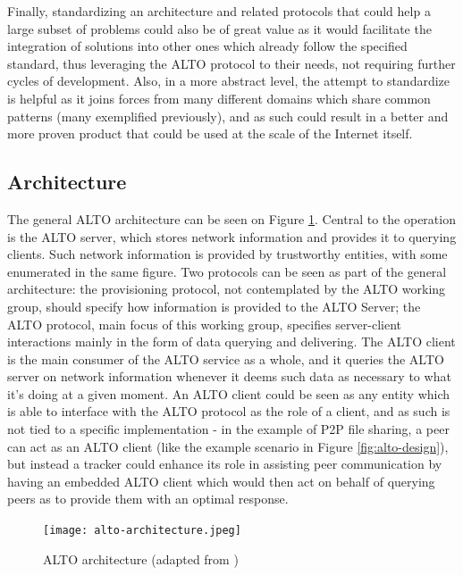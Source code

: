     Finally, standardizing an architecture and related protocols that could help a large subset of problems could also be of great value as it would facilitate the integration of solutions into other ones which already follow the specified standard, thus leveraging the ALTO protocol to their needs, not requiring further cycles of development.
    Also, in a more abstract level, the attempt to standardize is helpful as it joins forces from many different domains which share common patterns (many exemplified previously), and as such could result in a better and more proven product that could be used at the scale of the Internet itself.

\subsection{Architecture}


    The general ALTO architecture can be seen on Figure \ref{fig:alto-architecture}.
    Central to the operation is the ALTO server, which stores network information and provides it to querying clients.
    Such network information is provided by trustworthy entities, with some enumerated in the same figure.
    Two protocols can be seen as part of the general architecture: the provisioning protocol, not contemplated by the ALTO working group, should specify how information is provided to the ALTO Server; the ALTO protocol, main focus of this working group, specifies server-client interactions mainly in the form of data querying and delivering.
    The ALTO client is the main consumer of the ALTO service as a whole, and it queries the ALTO server on network information whenever it deems such data as necessary to what it's doing at a given moment.
    An ALTO client could be seen as any entity which is able to interface with the ALTO protocol as the role of a client, and as such is not tied to a specific implementation - in the example of P2P file sharing, a peer can act as an ALTO client (like the example scenario in Figure \ref{fig:alto-design}), but instead a tracker could enhance its role in assisting peer communication by having an embedded ALTO client which would then act on behalf of querying peers as to provide them with an optimal response.

\begin{figure}[!t]
\centering
\texttt{[image: alto-architecture.jpeg]}
\caption{ALTO architecture (adapted from \cite{alto-protocol}) }
\label{fig:alto-architecture}
\end{figure}

